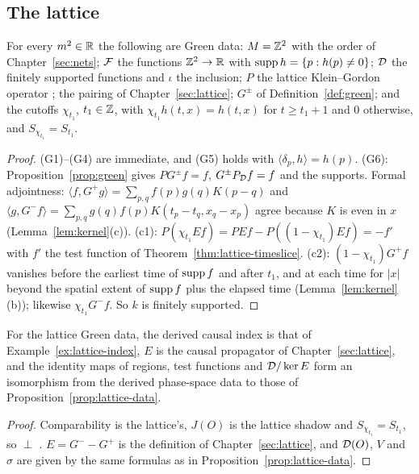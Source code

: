 \begin{extra}
\subsection{The lattice}

\begin{proposition}\label{prop:lattice-green}
For every $m^2\in\mathbb R$ the following are Green data: $M=\mathbb Z^2$ with the order of
Chapter~\ref{sec:nets}; $\mathcal F$ the functions $\mathbb Z^2\to\mathbb R$ with $\operatorname{supp} h=\{p:h(p)\neq0\}$; $\mathcal D$ the
finitely supported functions and $\iota$ the inclusion; $P$ the lattice Klein--Gordon operator
;
the pairing of Chapter~\ref{sec:lattice}; $G^\pm$ of Definition~\ref{def:green}; and the cutoffs
$\chi_{t_1}$, $t_1\in\mathbb Z$, with $\chi_{t_1}h(t,x)=h(t,x)$ for $t\geq t_1+1$ and $0$ otherwise, and
$S_{\chi_{t_1}}=S_{t_1}$.
\end{proposition}
\begin{proof}
(G1)--(G4) are immediate, and (G5) holds with $\langle\delta_p,h\rangle=h(p)$. (G6):
Proposition~\ref{prop:green} gives $PG^\pm f=f$, $G^\pm P_\mathcal D f=f$ and the supports. Formal
adjointness: $\langle f,G^+g\rangle=\sum_{p,q}f(p)g(q)K(p-q)$ and
$\langle g,G^-f\rangle=\sum_{p,q}g(q)f(p)K(t_p-t_q,x_q-x_p)$ agree because $K$ is even in $x$
(Lemma~\ref{lem:kernel}(c)). (c1): $P(\chi_{t_1}Ef)=PEf-P((1-\chi_{t_1})Ef)=-f'$ with $f'$ the
test function of Theorem~\ref{thm:lattice-timeslice}. (c2): $(1-\chi_{t_1})G^+f$ vanishes before the
earliest time of $\operatorname{supp} f$ and after $t_1$, and at each time for $|x|$ beyond the spatial extent
of $\operatorname{supp} f$ plus the elapsed time (Lemma~\ref{lem:kernel}(b)); likewise $\chi_{t_1}G^-f$. So $k$
is finitely supported.
\end{proof}

\begin{theorem}\label{thm:lattice-green-compare}
For the lattice Green data, the derived causal index is that of Example~\ref{ex:lattice-index},
$E$ is the causal propagator of Chapter~\ref{sec:lattice}, and the identity maps of regions, test
functions and $\mathcal D/\ker E$ form an isomorphism from the derived phase-space data to those of
Proposition~\ref{prop:lattice-data}.
\end{theorem}
\begin{proof}
Comparability is the lattice's, $J(O)$ is the lattice shadow and $S_{\chi_{t_1}}=S_{t_1}$, so
$\perp$ . $E=G^--G^+$ is the definition of Chapter~\ref{sec:lattice}, and
$\mathcal D(O)$, $V$ and $\sigma$ are given by the same formulas as in
Proposition~\ref{prop:lattice-data}.
\end{proof}


\end{extra}
